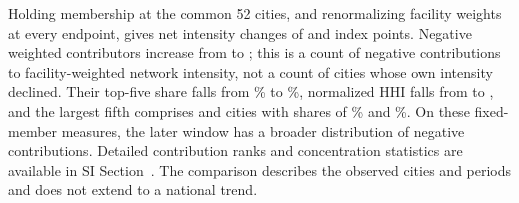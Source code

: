 Holding membership at the common 52 cities, and renormalizing facility weights at every endpoint, gives net intensity changes of \CommonEarlyNet{} and \CommonRecentNet{} index points. Negative weighted contributors increase from \CommonEarlyNegativeN{} to \CommonRecentNegativeN{}; this is a count of negative contributions to facility-weighted network intensity, not a count of cities whose own intensity declined. Their top-five share falls from \CommonEarlyTopFive\% to \CommonRecentTopFive\%, normalized HHI falls from \CommonEarlyHHI{} to \CommonRecentHHI, and the largest fifth comprises \CommonEarlyTopTwentyN{} and \CommonRecentTopTwentyN{} cities with shares of \CommonEarlyTopTwenty\% and \CommonRecentTopTwenty\%. On these fixed-member measures, the later window has a broader distribution of negative contributions. Detailed contribution ranks and concentration statistics are available in SI Section~. The comparison describes the observed cities and periods and does not extend to a national trend.


